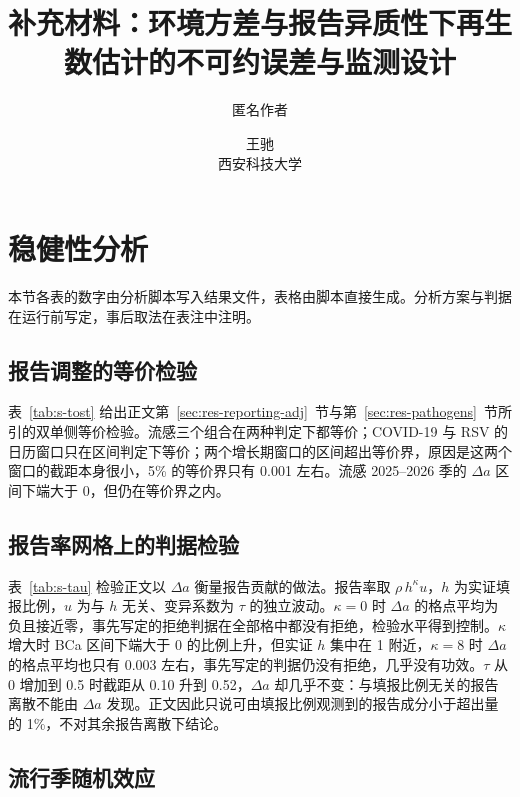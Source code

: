 \documentclass[fontset=none,10pt,a4paper]{ctexart}
\title{\textbf{补充材料：环境方差与报告异质性下再生数估计的不可约误差与监测设计}}
\author{匿名作者}
\author{王驰\\[2pt]{\small 西安科技大学}}
\date{}
\theoremstyle{zhplain}
\begin{document}
\maketitle
\thispagestyle{plain}
\normalfont\mdseries



\section{稳健性分析}
\label{sec:s-robust}

本节各表的数字由分析脚本写入结果文件，表格由脚本直接生成。分析方案与判据在运行前写定，事后取法在表注中注明。

\subsection{报告调整的等价检验}
\label{sec:s-tost}

表~\ref{tab:s-tost} 给出正文第~\ref{sec:res-reporting-adj}~节与第~\ref{sec:res-pathogens}~节所引的双单侧等价检验。流感三个组合在两种判定下都等价；COVID-19 与 RSV 的日历窗口只在区间判定下等价；两个增长期窗口的区间超出等价界，原因是这两个窗口的截距本身很小，5\% 的等价界只有 0.001 左右。流感 2025--2026 季的 $\Delta a$ 区间下端大于 0，但仍在等价界之内。

\subsection{报告率网格上的判据检验}
\label{sec:s-tau}

表~\ref{tab:s-tau} 检验正文以 $\Delta a$ 衡量报告贡献的做法。报告率取 $\rho\,h^\kappa u$，$h$ 为实证填报比例，$u$ 为与 $h$ 无关、变异系数为 $\tau$ 的独立波动。$\kappa=0$ 时 $\Delta a$ 的格点平均为负且接近零，事先写定的拒绝判据在全部格中都没有拒绝，检验水平得到控制。$\kappa$ 增大时 BCa 区间下端大于 0 的比例上升，但实证 $h$ 集中在 1 附近，$\kappa=8$ 时 $\Delta a$ 的格点平均也只有 0.003 左右，事先写定的判据仍没有拒绝，几乎没有功效。$\tau$ 从 0 增加到 0.5 时截距从 0.10 升到 0.52，$\Delta a$ 却几乎不变：与填报比例无关的报告离散不能由 $\Delta a$ 发现。正文因此只说可由填报比例观测到的报告成分小于超出量的 1\%，不对其余报告离散下结论。

\subsection{流行季随机效应}
\label{sec:s-seasons}
\end{document}
